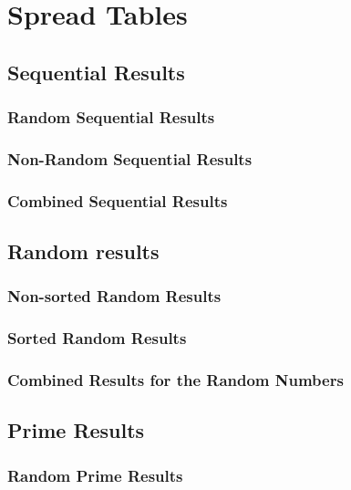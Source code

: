 \section{Spread Tables}
\label{spread_tables}
\subsection{Sequential Results}
\subsubsection{Random Sequential Results}


\subsubsection{Non-Random Sequential Results}


\subsubsection{Combined Sequential Results}


\subsection{Random results}
\subsubsection{Non-sorted Random Results}


\subsubsection{Sorted Random Results}

\subsubsection{Combined Results for the Random Numbers}


\subsection{Prime Results}
\subsubsection{Random Prime Results}


